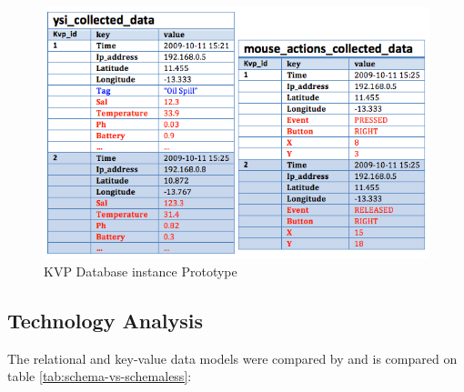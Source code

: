 \begin{figure}[!h]
  \centering
  \includegraphics[scale=0.5]{../diagrams/persistence-example-kvp}
  \caption{KVP Database instance Prototype}
  \label{fig:persistence-example-kvp}
\end{figure}

\subsection{Technology Analysis}

The relational and key-value data models were compared by
\cite{db-is-rdbs-dommed} and is compared on table
\ref{tab:schema-vs-schemaless}:

